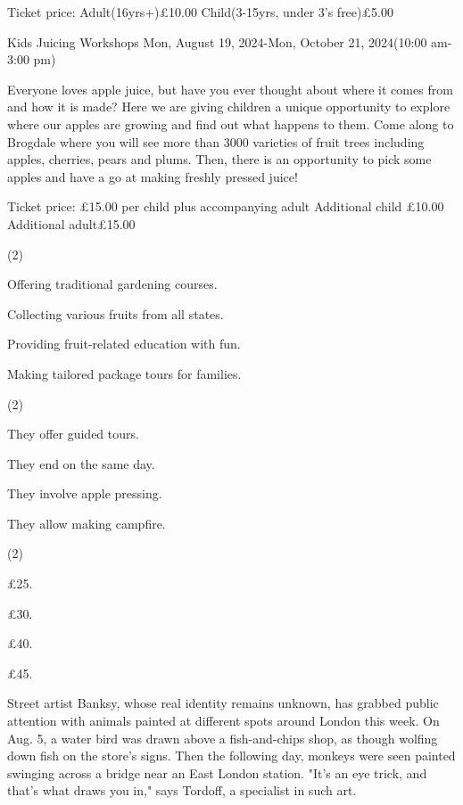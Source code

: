 \documentclass{英语试卷}
\begin{document}
\par Ticket price: Adult(16yrs+)£10.00 Child(3-15yrs, under 3's free)£5.00\par
\par Kids Juicing Workshops Mon, August 19, 2024-Mon, October 21, 2024(10:00 am-3:00 pm)\par
\par Everyone loves apple juice, but have you ever thought about where it comes from and how it is made? Here we are giving children a unique opportunity to explore where our apples are growing and find out what happens to them. Come along to Brogdale where you will see more than 3000 varieties of fruit trees including apples, cherries, pears and plums. Then, there is an opportunity to pick some apples and have a go at making freshly pressed juice!\par
\par Ticket price: £15.00 per child plus accompanying adult Additional child £10.00 Additional adult£15.00\par
{}
\begin{choices}(2)
  \item Offering traditional gardening courses.
  \item Collecting various fruits from all states.
  \item Providing fruit-related education with fun.
  \item Making tailored package tours for families.
\end{choices}
\begin{choices}(2)
  \item They offer guided tours.
  \item They end on the same day.
  \item They involve apple pressing.
  \item They allow making campfire.
\end{choices}
\begin{choices}(2)
  \item £25.
  \item £30.
  \item £40.
  \item £45.
\end{choices}
\par Street artist Banksy, whose real identity remains unknown, has grabbed public attention with animals painted at different spots around London this week. On Aug. 5, a water bird was drawn above a fish-and-chips shop, as though wolfing down fish on the store's signs. Then the following day, monkeys were seen painted swinging across a bridge near an East London station. "It's an eye trick, and that's what draws you in," says Tordoff, a specialist in such art.\par
\end{document}
